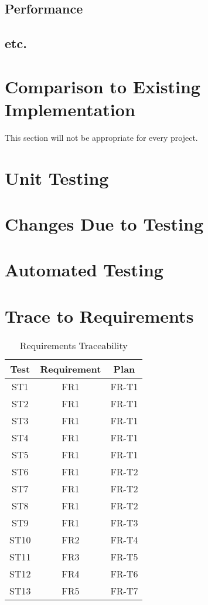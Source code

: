 \documentclass[12pt, titlepage]{article}
\begin{document}
\subsection{Performance}

\subsection{etc.}
	
\section{Comparison to Existing Implementation}	

This section will not be appropriate for every project.

\section{Unit Testing}

\section{Changes Due to Testing}


\section{Automated Testing}
		
\section{Trace to Requirements}

\begin{table}[H]
	\centering
	\caption{Requirements Traceability}
	\label{my-label}
	\begin{tabular}{|c|c|c|}
		\hline
		\textbf{Test} & \textbf{Requirement} & \textbf{Plan} \\ \hline
		ST1 & FR1 &FR-T1 \\ \hline
		ST2 & FR1 &FR-T1\\ \hline
		ST3 & FR1 &FR-T1\\ \hline
		ST4 & FR1 &FR-T1\\ \hline
		ST5 & FR1 &FR-T1\\ \hline
		ST6 & FR1 &FR-T2\\ \hline
		ST7 & FR1 &FR-T2\\ \hline
		ST8 & FR1 &FR-T2\\ \hline
		ST9 & FR1 &FR-T3\\ \hline
		ST10 & FR2 &FR-T4\\ \hline
		ST11 & FR3 &FR-T5\\ \hline
		ST12 & FR4 &FR-T6\\ \hline
		ST13 & FR5 & FR-T7\\ \hline
	\end{tabular}
\end{table}
		
\end{document}
